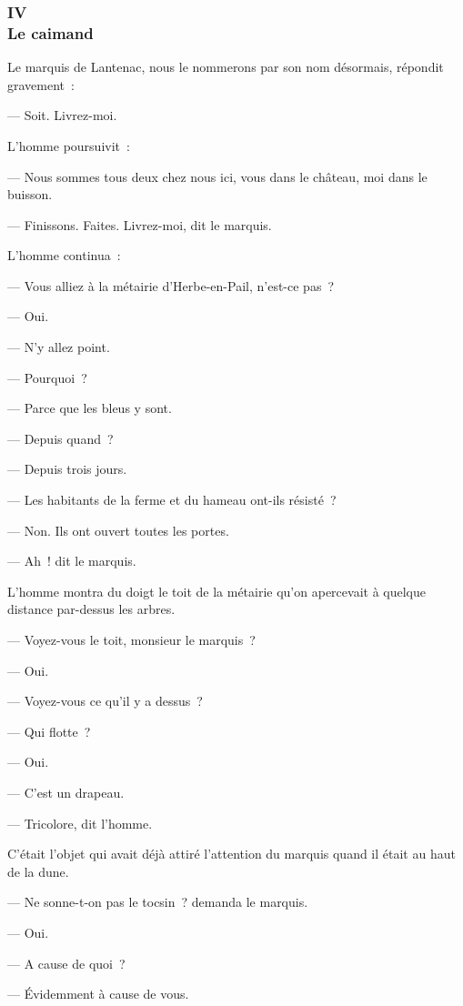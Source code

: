 \documentclass[french,twoside]{book} %
\begin{document}
 \subsubsection[{IV. Le caimand}]{IV \\
Le caimand}
\label{p1l4c4}
\noindent Le marquis de Lantenac, nous le nommerons par son nom désormais, répondit gravement :\par
— Soit. Livrez-moi.\par
L’homme poursuivit :\par
— Nous sommes tous deux chez nous ici, vous dans le château, moi dans le buisson.\par
— Finissons. Faites. Livrez-moi, dit le marquis.\par
L’homme continua :\par
— Vous alliez à la métairie d’Herbe-en-Pail, n’est-ce pas ?\par
— Oui.\par
— N’y allez point.\par
— Pourquoi ?\par
— Parce que les bleus y sont.\par
— Depuis quand ?\par
— Depuis trois jours.\par
— Les habitants de la ferme et du hameau ont-ils résisté ?\par
— Non. Ils ont ouvert toutes les portes.\par
— Ah ! dit le marquis.\par
L’homme montra du doigt le toit de la métairie  qu’on apercevait à quelque distance par-dessus les arbres.\par
— Voyez-vous le toit, monsieur le marquis ?\par
— Oui.\par
— Voyez-vous ce qu’il y a dessus ?\par
— Qui flotte ?\par
— Oui.\par
— C’est un drapeau.\par
— Tricolore, dit l’homme.\par
C’était l’objet qui avait déjà attiré l’attention du marquis quand il était au haut de la dune.\par
— Ne sonne-t-on pas le tocsin ? demanda le marquis.\par
— Oui.\par
— A cause de quoi ?\par
— Évidemment à cause de vous.\par
\end{document}
